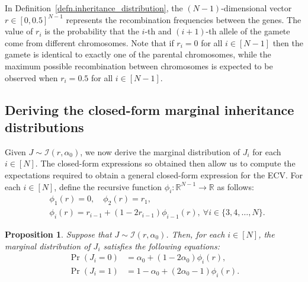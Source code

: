 \documentclass[12pt, a4paper, bibliography=totoc]{scrartcl}
\newtheorem{proposition}{Proposition}
\newcommand{\Iscr}{\mathcal{I}}
\begin{document}
In Definition~\ref{defn.inheritance_distribution}, the $(N-1)$-dimensional vector $r\in[0,0.5]^{N-1}$ represents the recombination frequencies between the genes. The value of $r_i$ is the probability that the $i$-th and $(i+1)$-th allele of the gamete come from different chromosomes. Note that if $r_i=0$ for all $i\in[N-1]$ then the gamete is identical to exactly one of the parental chromosomes, while the maximum possible recombination between chromosomes is expected to be observed when $r_i=0.5$ for all $i\in[N-1]$.

\subsection*{Deriving the closed-form marginal inheritance distributions}\label{subsec:inheritance_distr}
Given $J\sim\Iscr(r,\alpha_0)$, we now derive the marginal distribution of $J_i$ for each $i\in[N]$. The closed-form expressions so obtained then allow us to  compute the expectations required to obtain a general closed-form expression for the ECV.  For each $i \in [N]$, define the recursive function $\phi_i:\mathbb{R}^{N-1}\longrightarrow\mathbb{R}$ as follows: 
\begin{align}\label{eq:phi_init}
&\phi_1(r)=0,\quad  \phi_2(r) = r_1,\\
\label{eq:phi_recurse}   & \phi_i(r) =r_{i-1}+\left(1-2r_{i-1}\right)\phi_{i-1}(r), \ \forall i \in\{3,4,\ldots,N\}.
\end{align}

      
\begin{proposition} \label{prop.inherit_dist}
Suppose that $J\sim\Iscr(r,\alpha_0)$. Then, for each $i\in[N]$, the marginal distribution of $J_i$ satisfies the following equations:
\begin{subequations}\label{eq:distJ}
	\begin{align}
    \Pr(J_i=0) &= \alpha_0+(1-2\alpha_0)\phi_i(r), \label{eq:prob_Ji=0}\\
    \Pr(J_i=1) &= 1-\alpha_0+(2\alpha_0-1)\phi_i(r)\label{eq:prob_Ji=1}.
	\end{align}
\end{subequations}
\end{proposition}
\end{document}
